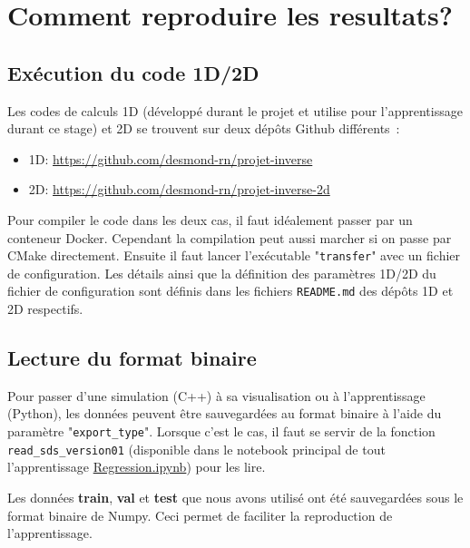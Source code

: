

\chapter{Comment reproduire les resultats?} %

\label{AppendixA} %

\section{Exécution du code 1D/2D}

Les codes de calculs 1D (développé durant le projet et utilise pour l'apprentissage durant ce stage) et 2D se trouvent sur deux dépôts Github différents :
\begin{itemize}
 \item 1D: \url{https://github.com/desmond-rn/projet-inverse} 
 \item 2D: \url{https://github.com/desmond-rn/projet-inverse-2d}
\end{itemize}

Pour compiler le code dans les deux cas, il faut idéalement passer par un conteneur Docker. Cependant la compilation peut aussi marcher si on passe par CMake directement.
Ensuite il faut lancer l'exécutable "\verb|transfer|" avec un fichier de configuration. Les détails ainsi que la définition des paramètres 1D/2D du fichier de configuration sont définis dans les fichiers \verb|README.md| des dépôts 1D et 2D respectifs.

\section{Lecture du format binaire}
Pour passer d'une simulation (C++) à sa visualisation ou à l'apprentissage (Python), les données peuvent être sauvegardées au format binaire à l'aide du paramètre "\verb|export_type|". Lorsque c'est le cas, il faut se servir de la fonction \verb|read_sds_version01| (disponible dans le notebook principal de tout l'apprentissage \href{https://colab.research.google.com/drive/18oCXoZzY0_7XnEmHBzHH40vVVnIacoVc?usp=sharing}{Regression.ipynb}) pour les lire.

Les données \textbf{train}, \textbf{val} et \textbf{test} que nous avons utilisé ont été sauvegardées sous le format binaire de Numpy. Ceci permet de faciliter la reproduction de l'apprentissage.



